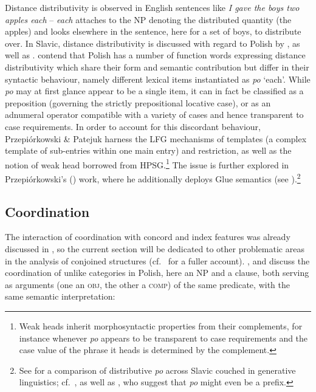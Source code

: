 \documentclass[output=paper,hidelinks]{langscibook}
\begin{document}
Distance distributivity is observed in English sentences like \textit{I gave the boys two apples each} -- \textit{each} attaches to the NP denoting the distributed quantity (the apples) and looks elsewhere in the sentence, here for a set of boys, to distribute over. In Slavic, distance distributivity is discussed with regard to Polish by \citet{Przepiorkowski2013,Przepiorkowski2014,Przepiorkowski2015}, as well as \citet{PrzepiorkowskiPatejuk2013}. \citet{PrzepiorkowskiPatejuk2013} contend that Polish has a number of function words expressing distance distributivity which share their form and semantic contribution but differ in their syntactic behaviour, namely different lexical items instantiated as \textit{po} `each'. While \textit{po} may at first glance appear to be a single item, it can in fact be classified as a preposition (governing the strictly prepositional locative case), or as an adnumeral operator compatible with a variety of cases and hence transparent to case requirements. In order to account for this discordant behaviour, Przepi{\'o}rkowski \& Patejuk harness the LFG mechanisms of templates (a complex template of sub-entries within one main entry) and restriction, as well as the notion of weak head borrowed from HPSG.\footnote{Weak heads inherit morphosyntactic properties from their complements, for instance whenever \textit{po} appears to be transparent to case requirements and the case value of the phrase it heads is determined by the complement.} The issue is further explored in Przepi{\'o}rkowski's (\citeyear{Przepiorkowski2013,Przepiorkowski2014,Przepiorkowski2015}) work, where he additionally deploys Glue semantics (see ).\footnote{See \citet[{\textsection}5.2.1]{Franks1995} for a comparison of distributive \textit{po} across Slavic couched in generative linguistics; cf.\ \citet[Chapter~32]{BergerGutschmidtKempgenKosta2009}, as well as \citet[467--468]{SussexCubberley2006}, who suggest that \textit{po} might even be a prefix.} 

\subsection{Coordination}
\label{sec:Slavic:2.11}

The interaction of coordination with concord and index features was already discussed in , so the current section will be dedicated to other problematic areas in the analysis of conjoined structures (cf.\  for a fuller account).  \citet{przepiorkowski-patejuk2012}, \citet[338--339]{PatejukPrzepiorkowski2012,PatejukPrzepiorkowski2014a,PatejukPrzepiorkowski2017} and \citet{Patejuk2015} discuss the coordination of unlike categories in Polish, here an NP and a clause, both serving as arguments (one an \textsc{obj}, the other a \textsc{comp}) of the same predicate, with the same semantic interpretation:
\end{document}
